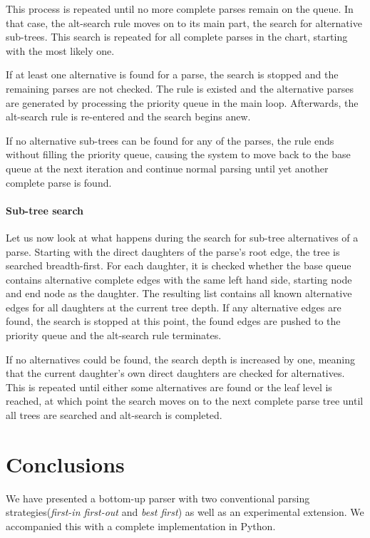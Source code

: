 \documentclass[11pt, titlepage, a4paper]{scrartcl}		%
\newcommand{\xmas}[1]{alt-search#1}
\begin{document}
This process is repeated until no more complete parses remain on the queue.
In that case, the \xmas{} rule moves on to its main part, the search for alternative sub-trees.
This search is repeated for all complete parses in the chart, starting with the most likely one.

If at least one alternative is found for a parse, the search is stopped and the remaining parses are not checked.
The rule is existed and the alternative parses are generated by processing the priority queue in the main loop.
Afterwards, the \xmas{} rule is re-entered and the search begins anew.

If no alternative sub-trees can be found for any of the parses, the rule ends without filling the priority queue, causing the system to move back to the base queue at the next iteration and continue normal parsing until yet another complete parse is found.

\paragraph{Sub-tree search}
Let us now look at what happens during the search for sub-tree alternatives of a parse.
Starting with the direct daughters of the parse's root edge, the tree is searched breadth-first.
For each daughter, it is checked whether the base queue contains alternative complete edges with the same left hand side, starting node and end node as the daughter. The resulting list contains all known alternative edges for all daughters at the current tree depth.
If any alternative edges are found, the search is stopped at this point, the found edges are pushed to the priority queue and the \xmas{} rule terminates.

If no alternatives could be found, the search depth is increased by one, meaning that the current daughter's own direct daughters are checked for alternatives. This is repeated until either some alternatives are found or the leaf level is reached, at which point the search moves on to the next complete parse tree until all trees are searched and \xmas{} is completed.

\section{Conclusions}
We have presented a bottom-up parser with two conventional parsing strategies(\textit{first-in first-out} and \textit{best first}) as well as an experimental extension. We accompanied this with a complete implementation in Python.
\end{document}
